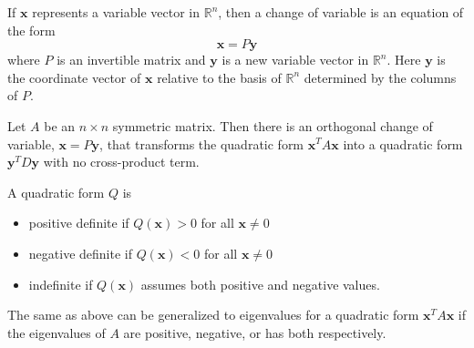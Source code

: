 \documentclass[../linalg.tex]{subfiles}
\begin{document}
If $\textbf{x}$ represents a variable vector in $\mathbb{R}^n$, then a change of variable is an equation of the form 
\[ \textbf{x}=P\textbf{y} \]
where $P$ is an invertible matrix and $\textbf{y}$ is a new variable vector in $\mathbb{R}^n$. Here $\textbf{y}$ is the coordinate vector of $\textbf{x}$ relative to the basis of $\mathbb{R}^n$ determined by the columns of $P$.

\begin{theorem}
    Let $A$ be an $n\times n$ symmetric matrix. Then there is an orthogonal change of variable, $\textbf{x}=P\textbf{y}$, that transforms the quadratic form $\textbf{x}^TA\textbf{x}$ into a quadratic form 
    $\textbf{y}^TD\textbf{y}$ with no cross-product term.
\end{theorem}

\begin{definition}
    A quadratic form $Q$ is 
    \begin{itemize}
        \item positive definite if $Q(\textbf{x})>0$ for all $\textbf{x}\neq 0$
        \item negative definite if $Q(\textbf{x})<0$ for all $\textbf{x}\neq 0$
        \item indefinite if $Q(\textbf{x})$ assumes both positive and negative values.
    \end{itemize}
\end{definition}

The same as above can be generalized to eigenvalues for a quadratic form $\textbf{x}^TA\textbf{x}$ if the eigenvalues of $A$ are positive, negative, or has both respectively.
\end{document}
